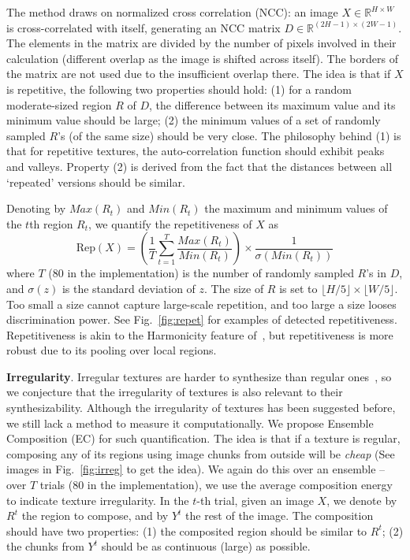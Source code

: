 The method draws on normalized cross correlation (NCC): an image $X
\in \mathbb{R}^{H\times W}$ is cross-correlated with itself,
generating an NCC matrix $D\in \mathbb{R}^{(2H-1)\times (2W-1)}$. The
elements in the matrix are divided by the number of pixels involved in
their calculation (different overlap as the image is shifted across
itself). The borders of the matrix are not used due to the insufficient
overlap there. The idea is that  if $X$ is repetitive, the following two
properties should hold: (1) for a random moderate-sized region $R$ of
$D$, the difference between its maximum value and its minimum value
should be large; (2) the minimum values of a set of randomly sampled
$R$'s (of the same size) should be very close.  The philosophy behind
(1) is that for repetitive textures, the auto-correlation function
should exhibit peaks and valleys. Property (2) is derived from the fact
that the distances between all `repeated' versions should be
similar.

Denoting by $Max(R_t)$ and $Min(R_t)$ the maximum and minimum values
of the $t$th region $R_t$, we quantify the repetitiveness of $X$ as
\begin{equation} 
\text{Rep}(X) = \left( \frac{1}{T} \sum_{t=1}^T \frac{Max(R_t)}{Min(R_t)} \right)
                \times \frac{1}{\sigma(Min(R_t))}
\end{equation}
where $T$ ($80$ in the implementation) is the number of randomly
sampled $R$'s in $D$, and $\sigma(z)$ is the standard deviation of
$z$. The size of $R$ is set to $\lfloor H/5 \rfloor \times \lfloor W/5
\rfloor$. Too small a size cannot capture large-scale repetition, and
too large a size looses discrimination power.  See
Fig.~\ref{fig:repet} for examples of detected
repetitiveness. Repetitiveness is akin to the Harmonicity feature
of~\citep{liu:texture:96}, but repetitiveness is more robust due to its
pooling over local regions.

\textbf{Irregularity}. Irregular textures are harder to synthesize
than regular ones~\citep{Liu:2004:NTA}, so we conjecture that the
irregularity of textures is also relevant to their
synthesizability. Although the irregularity of textures has been
suggested before, we still lack a method to measure it
computationally. We propose Ensemble Composition (EC) for such
quantification. The idea is that if a texture is regular, composing
any of its regions using image chunks from outside will be
\emph{cheap} (See images in Fig.~\ref{fig:irreg} to get the idea).  We
again do this over an ensemble -- over $T$ trials ($80$ in the
implementation), we use the average composition energy to indicate
texture irregularity. In the $t$-th trial, given an image $X$, we
denote by $R^t$ the region to compose, and by $Y^t$ the rest of the
image. The composition should have two properties: (1) the composited
region should be similar to $R^t$; (2) the chunks from $Y^t$ should be
as continuous (large) as possible.


